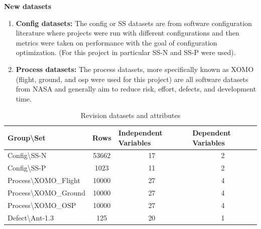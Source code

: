 \documentclass[]{svjour3}
\begin{document}
\textbf{New datasets}
\begin{enumerate}
    \item \textbf{Config datasets:} The config or SS datasets are from software configuration literature where projects were run with different configurations and then metrics were taken on performance with the goal of configuration optimization. (For this project in particular SS-N and SS-P were used). ~\cite{configSets}
    \item \textbf{Process datasets:} The process datasets, more specifically known as XOMO (flight, ground, and osp were used for this project) are all software datasets from NASA and generally aim to reduce risk, effort, defects, and development time. ~\cite{ProcessSets}
\end{enumerate}

\begin{table}[]
\centering
\caption{Revision datasets and attributes}
\label{Revision_Dataset_Attributes}
\begin{tabular}{|l|c|c|c|}
\hline
\textbf{Group\textbackslash{}Set}   & \multicolumn{1}{l|}{\textbf{Rows}} & \multicolumn{1}{l|}{\textbf{Independent Variables}} & \multicolumn{1}{l|}{\textbf{Dependent  Variables}} \\ \hline
Config\textbackslash{}SS-N          & 53662                              & 17                                                  & 2                                                  \\ \hline
Config\textbackslash{}SS-P          & 1023                               & 11                                                  & 2                                                  \\ \hline
Process\textbackslash{}XOMO\_Flight & 10000                              & 27                                                  & 4                                                  \\ \hline
Process\textbackslash{}XOMO\_Ground & 10000                              & 27                                                  & 4                                                  \\ \hline
Process\textbackslash{}XOMO\_OSP    & 10000                              & 27                                                  & 4                                                  \\ \hline
Defect\textbackslash{}Ant-1.3       & 125                                & 20                                                  & 1                                                  \\ \hline

\end{tabular}
\end{table}
\end{document}
